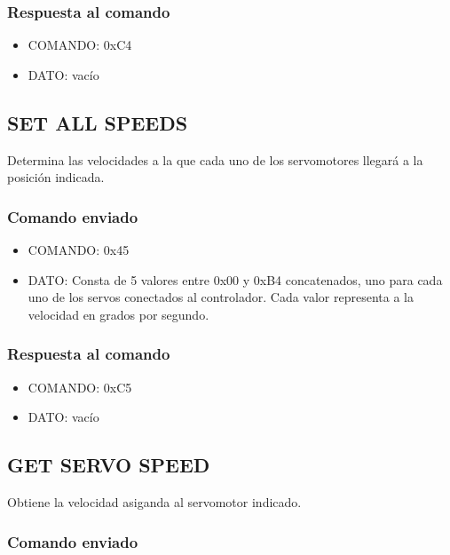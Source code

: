 \documentclass[a4paper,10pt]{article}
\begin{document}
\subsubsection*{Respuesta al comando}

\begin{itemize}
	\item{COMANDO:} 0xC4
	\item{DATO:} vac\'io
\end{itemize}

\subsection{SET ALL SPEEDS}
\label{set_all_speeds}

Determina las velocidades a la que cada uno de los servomotores llegar\'a a la posici\'on indicada.

\subsubsection*{Comando enviado}

\begin{itemize}
	\item{COMANDO:} 0x45
	\item{DATO:} Consta de 5 valores entre 0x00 y 0xB4 concatenados, uno para cada uno de los servos conectados al controlador.
	Cada valor representa a la velocidad en grados por segundo.
\end{itemize}

\subsubsection*{Respuesta al comando}

\begin{itemize}
	\item{COMANDO:} 0xC5
	\item{DATO:} vac\'io
\end{itemize}

\subsection{GET SERVO SPEED}
\label{get_servo_speed}

Obtiene la velocidad asiganda al servomotor indicado.

\subsubsection*{Comando enviado}
\end{document}
